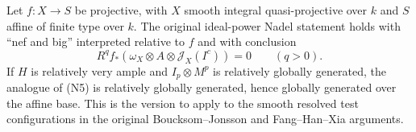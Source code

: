 \begin{theorem}
\label{thm:kn-nadel-relative-source-application}
\notready
Let $f:X\to S$ be projective, with $X$ smooth integral quasi-projective over
$k$ and $S$ affine of finite type over $k$.  The original ideal-power
Nadel statement holds with ``nef and big'' interpreted relative to
$f$ and with conclusion
\[
 R^q f_*(\omega_X\otimes A\otimes\mathcal J_X(I^c))=0
 \qquad(q>0).
 \tag{N6}
\]
If $H$ is relatively very ample and $I_p\otimes M^p$ is relatively
globally generated, the analogue of (N5) is relatively globally
generated, hence globally generated over the affine base.  This is
the version to apply to the smooth resolved test configurations in
the original Boucksom--Jonsson and Fang--Han--Xia arguments.
\end{theorem}
